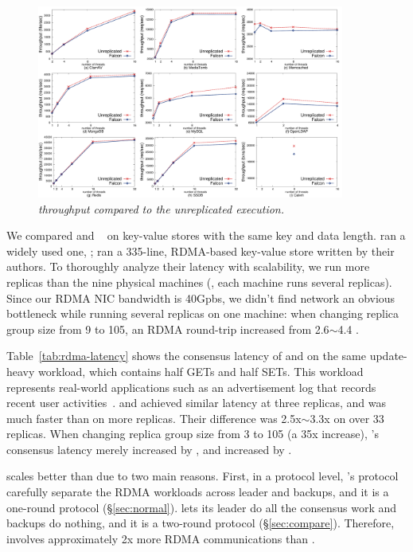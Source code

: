 \begin{figure}[t]
\centering
\includegraphics[width=0.9\textwidth]{figures/throughput}
\vspace{-.10in}
\caption{\small {\em \xxx throughput compared to the unreplicated
execution.}}
\vspace{-.20in}
\label{fig:tput}
\end{figure}

We compared \xxx and \dare~\cite{dare:hpdc15} on key-value stores with the same 
key and data length. \xxx ran a widely used one, \redis; \dare ran a 335-line, 
RDMA-based key-value store written by their authors. To thoroughly analyze 
their latency with scalability, we run more replicas than the nine physical 
machines (\ie, each machine runs several replicas). Since our RDMA NIC 
bandwidth is 40Gpbs, we didn't find network an obvious bottleneck while running 
several replicas on one machine: when changing replica group size from 9 to 
105, an RDMA round-trip increased from 2.6$\sim$4.4 \us.

Table~\ref{tab:rdma-latency} shows the consensus latency of \xxx and 
\dare on the same update-heavy workload, which contains half GETs and half 
SETs. This workload represents real-world applications such as an advertisement 
log that records recent user activities~\cite{dare:hpdc15}. \xxx and \dare 
achieved similar latency at three replicas, and \xxx was much faster than \dare 
on more replicas. Their difference was 2.5x$\sim$3.3x on over 33 replicas. When 
changing replica group size from 3 to 105 (a 35x increase), \xxx's consensus 
latency merely increased by \xxxscalability, and \dare increased by 
\darescalability.

\xxx scales better than \dare due to two main reasons. First, in a protocol 
level, \xxx's protocol carefully separate the RDMA workloads across leader and 
backups, and it is a one-round protocol (\S\ref{sec:normal}). \dare lets its 
leader do all the consensus work and backups do nothing, and it is a two-round 
protocol (\S\ref{sec:compare}). Therefore, \dare involves approximately 2x more 
RDMA communications than \xxx.

